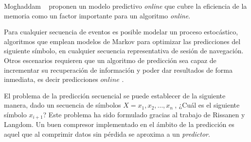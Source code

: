 Moghaddam \etal~\cite{Moghaddam2009} proponen un modelo predictivo \emph{online} que cubre la eficiencia de la memoria como un factor importante para un algoritmo \emph{online}. 

Para cualquier secuencia de eventos es posible modelar un proceso estocástico, algoritmos que emplean modelos de Markov para optimizar las predicciones del siguiente símbolo, en cualquier secuencia representativa  de sesión de navegación. Otros escenarios requieren que un algoritmo de predicción sea capaz de incrementar su recuperación de información  y poder dar resultados de forma inmediata, es decir predicciones $online$ .

El problema de la predicción secuencial se puede establecer de la siguiente manera, dado un secuencia de símbolos $ X = x_{1}, x_{2}, \dots, x_{n}\ $, ¿Cuál es el siguiente símbolo $x_{i+1}$? Este problema ha sido formulado gracias al trabajo de  Rissanen\cite{Rissanen1983} y Langdom\cite{Langdon1983}. Un buen compresor implementado en el ámbito de la predicción es aquel que al comprimir datos sin pérdida se aproxima a un \emph{predictor}.















